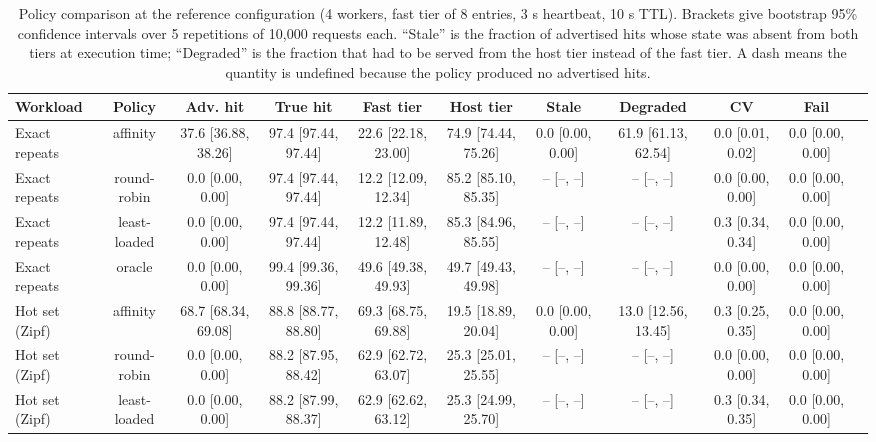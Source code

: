 \begin{table}[t]
\centering
\scriptsize
\setlength{\tabcolsep}{2.5pt}
\caption{Policy comparison at the reference configuration (4 workers, fast tier of 8 entries, 3 s heartbeat, 10 s TTL). Brackets give bootstrap 95\% confidence intervals over 5 repetitions of 10,000 requests each. ``Stale'' is the fraction of advertised hits whose state was absent from both tiers at execution time; ``Degraded'' is the fraction that had to be served from the host tier instead of the fast tier. A dash means the quantity is undefined because the policy produced no advertised hits.}
\label{tab:policy-comparison}
\begin{tabular}{lcccccccccc}
\toprule
Workload & Policy & Adv. hit & True hit & Fast tier & Host tier & Stale & Degraded & CV & Fail \\
\midrule
Exact repeats & affinity & 37.6 \tiny [36.88, 38.26] & 97.4 \tiny [97.44, 97.44] & 22.6 \tiny [22.18, 23.00] & 74.9 \tiny [74.44, 75.26] & 0.0 \tiny [0.00, 0.00] & 61.9 \tiny [61.13, 62.54] & 0.0 \tiny [0.01, 0.02] & 0.0 \tiny [0.00, 0.00] \\
Exact repeats & round-robin & 0.0 \tiny [0.00, 0.00] & 97.4 \tiny [97.44, 97.44] & 12.2 \tiny [12.09, 12.34] & 85.2 \tiny [85.10, 85.35] & -- \tiny [--, --] & -- \tiny [--, --] & 0.0 \tiny [0.00, 0.00] & 0.0 \tiny [0.00, 0.00] \\
Exact repeats & least-loaded & 0.0 \tiny [0.00, 0.00] & 97.4 \tiny [97.44, 97.44] & 12.2 \tiny [11.89, 12.48] & 85.3 \tiny [84.96, 85.55] & -- \tiny [--, --] & -- \tiny [--, --] & 0.3 \tiny [0.34, 0.34] & 0.0 \tiny [0.00, 0.00] \\
Exact repeats & oracle & 0.0 \tiny [0.00, 0.00] & 99.4 \tiny [99.36, 99.36] & 49.6 \tiny [49.38, 49.93] & 49.7 \tiny [49.43, 49.98] & -- \tiny [--, --] & -- \tiny [--, --] & 0.0 \tiny [0.00, 0.00] & 0.0 \tiny [0.00, 0.00] \\
Hot set (Zipf) & affinity & 68.7 \tiny [68.34, 69.08] & 88.8 \tiny [88.77, 88.80] & 69.3 \tiny [68.75, 69.88] & 19.5 \tiny [18.89, 20.04] & 0.0 \tiny [0.00, 0.00] & 13.0 \tiny [12.56, 13.45] & 0.3 \tiny [0.25, 0.35] & 0.0 \tiny [0.00, 0.00] \\
Hot set (Zipf) & round-robin & 0.0 \tiny [0.00, 0.00] & 88.2 \tiny [87.95, 88.42] & 62.9 \tiny [62.72, 63.07] & 25.3 \tiny [25.01, 25.55] & -- \tiny [--, --] & -- \tiny [--, --] & 0.0 \tiny [0.00, 0.00] & 0.0 \tiny [0.00, 0.00] \\
Hot set (Zipf) & least-loaded & 0.0 \tiny [0.00, 0.00] & 88.2 \tiny [87.99, 88.37] & 62.9 \tiny [62.62, 63.12] & 25.3 \tiny [24.99, 25.70] & -- \tiny [--, --] & -- \tiny [--, --] & 0.3 \tiny [0.34, 0.35] & 0.0 \tiny [0.00, 0.00] \\

\end{tabular}
\end{table}

